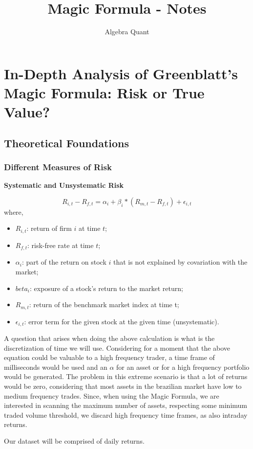 \documentclass{article}
\title{Magic Formula - Notes}
\author{Algebra Quant}
\begin{document}
  \maketitle

  \section{In-Depth Analysis of Greenblatt's Magic Formula: Risk or True Value?}
  \subsection{Theoretical Foundations}
  \subsubsection{Different Measures of Risk}
  \textbf{Systematic and Unsystematic Risk}

\begin{equation}
  R_{i,t} - R_{f,t} = \alpha_{i} + \beta_{i} * (R_{m,t} - R_{f,t}) + \epsilon_{i,t}
\end{equation}
where,
\begin{itemize}
  \item $R_{i,t}$: return of firm $i$ at time $t$;
  \item $R_{f,t}$: risk-free rate at time $t$;
  \item $\alpha_{i}$: part of the return on stock $i$ that is not explained by covariation with the market;
  \item $beta_{i}$: exposure of a stock's return to the market return;
  \item $R_{m,t}$: return of the benchmark market index at time t;
  \item $\epsilon_{i,t}$: error term for the given stock at the given time (unsystematic).
\end{itemize}

A question that arises when doing the above calculation is what is the discretization of time we will use. Considering for a moment that the above equation could be valuable to a high frequency trader, a time frame of milliseconds would be used and an $\alpha$ for an asset or for a high frequency portfolio would be generated. The problem in this extreme scenario is that a lot of returns would be zero, considering that most assets in the brazilian market have low to medium frequency trades. Since, when using the Magic Formula, we are interested in scanning the maximum number of assets, respecting some minimum traded volume threshold, we discard high frequency time frames, as also intraday returns. 

Our dataset will be comprised of daily returns. 
\end{document}
